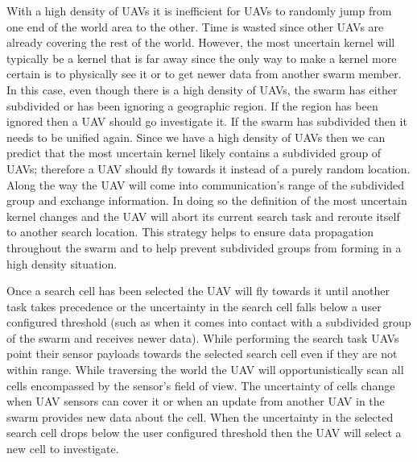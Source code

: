 With a high density of UAVs it is inefficient for UAVs to randomly jump from one end of the world area to the other.  Time is wasted since other UAVs are already covering the rest of the world.  However, the most uncertain kernel will typically be a kernel that is far away since the only way to make a kernel more certain is to physically see it or to get newer data from another swarm member.  In this case, even though there is a high density of UAVs, the swarm has either subdivided or has been ignoring a geographic region.  If the region has been ignored then a UAV should go investigate it.  If the swarm has subdivided then it needs to be unified again. Since we have a high density of UAVs then we can predict that the most uncertain kernel likely contains a subdivided group of UAVs; therefore a UAV should fly towards it instead of a purely random location.  Along the way the UAV will come into communication's range of the subdivided group and exchange information.  In doing so the definition of the most uncertain kernel changes and the UAV will abort its current search task and reroute itself to another search location.  This strategy helps to ensure data propagation throughout the swarm and to help prevent subdivided groups from forming in a high density situation.






Once a search cell has been selected the UAV will fly towards it until another task takes precedence or the uncertainty in the search cell falls below a user configured threshold (such as when it comes into contact with a subdivided group of the swarm and receives newer data).  While performing the search task UAVs point their sensor payloads towards the selected search cell even if they are not within range.  While traversing the world the UAV will opportunistically scan all cells encompassed by the sensor's field of view.  The uncertainty of cells change when UAV sensors can cover it or when an update from another UAV in the swarm provides new data about the cell. When the uncertainty in the selected search cell drops below the user configured threshold then the UAV will select a new cell to investigate.  

